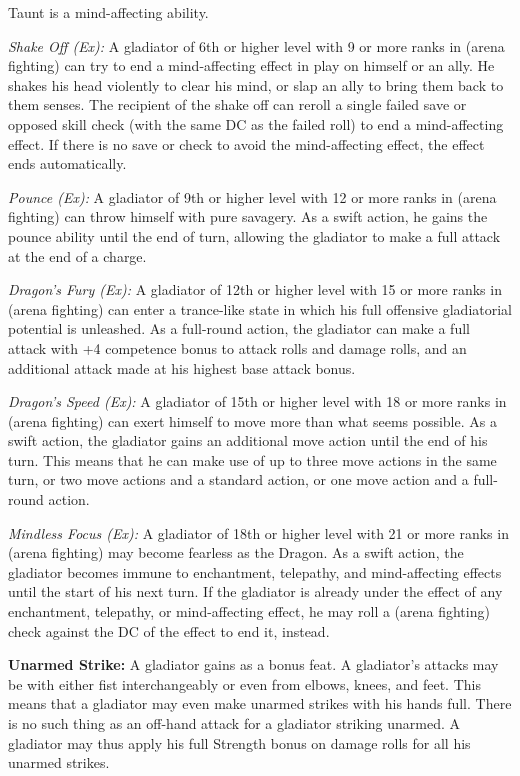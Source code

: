 Taunt is a mind-affecting ability.

\textit{Shake Off (Ex):} A gladiator of 6th or higher level with 9 or more ranks in  (arena fighting) can try to end a mind-affecting effect in play on himself or an ally. He shakes his head violently to clear his mind, or slap an ally to bring them back to them senses. The recipient of the shake off can reroll a single failed save or opposed skill check (with the same DC as the failed roll) to end a mind-affecting effect. If there is no save or check to avoid the mind-affecting effect, the effect ends automatically.

\textit{Pounce (Ex):} A gladiator of 9th or higher level with 12 or more ranks in  (arena fighting) can throw himself with pure savagery. As a swift action, he gains the pounce ability until the end of turn, allowing the gladiator to make a full attack at the end of a charge.

\textit{Dragon's Fury (Ex):} A gladiator of 12th or higher level with 15 or more ranks in  (arena fighting) can enter a trance-like state in which his full offensive gladiatorial potential is unleashed. As a full-round action, the gladiator can make a full attack with +4 competence bonus to attack rolls and damage rolls, and an additional attack made at his highest base attack bonus.

\textit{Dragon's Speed (Ex):} A gladiator of 15th or higher level with 18 or more ranks in  (arena fighting) can exert himself to move more than what seems possible. As a swift action, the gladiator gains an additional move action until the end of his turn. This means that he can make use of up to three move actions in the same turn, or two move actions and a standard action, or one move action and a full-round action.

\textit{Mindless Focus (Ex):} A gladiator of 18th or higher level with 21 or more ranks in  (arena fighting) may become fearless as the Dragon. As a swift action, the gladiator becomes immune to enchantment, telepathy, and mind-affecting effects until the start of his next turn. If the gladiator is already under the effect of any enchantment, telepathy, or mind-affecting effect, he may roll a  (arena fighting) check against the DC of the effect to end it, instead.

\textbf{Unarmed Strike:} A gladiator gains  as a bonus feat. A gladiator's attacks may be with either fist interchangeably or even from elbows, knees, and feet. This means that a gladiator may even make unarmed strikes with his hands full. There is no such thing as an off-hand attack for a gladiator striking unarmed. A gladiator may thus apply his full Strength bonus on damage rolls for all his unarmed strikes.

